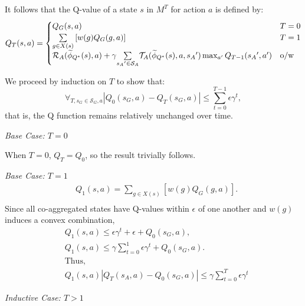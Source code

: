 It follows that the Q-value of a state $s$ in $M^T$ for action $a$ is defined by:
\begin{equation}
Q_T(s, a) = 
\begin{cases}
	   Q_G(s, a) &  T=0\\
	   \underset{g \in X(s)}{\sum} \left[ w(g)Q_G(g,a) \right] & T = 1\\
	   \mathcal{R}_A(\widetilde \phi_{Q^*}(s),a) + \gamma \underset{{s_A}' \in \mathcal{S}_A}{\sum} \mathcal{T}_A(\widetilde \phi_{Q^*}(s),a,{s_A}') \max_{a'} Q_{T-1}({s_A}', a') & \text{o/w}
\end{cases}
\end{equation}

We proceed by induction on $T$ to show that:
\begin{equation}
\forall_{T, s_G \in \mathcal{S}_G, a} |Q_0(s_G, a) - Q_T(s_G, a)| \leq \sum_{t=0}^{T-1} \epsilon \gamma^{t},
\end{equation}
that is, the Q function remains relatively unchanged over time.

\textit{Base Case: $T = 0$}

When $T = 0$, $Q_T = Q_0$, so the result trivially follows.

\textit{Base Case: $T = 1$}
\begin{align*}
&Q_1(s,a) = \underset{g \in X(s)}{\sum} \left[ w(g)Q_G(g,a) \right].\\
\end{align*}
Since all co-aggregated states have Q-values within $\epsilon$ of one another and $w(g)$ induces a convex combination,
\begin{align*}
&Q_1(s,a) \leq \epsilon \gamma^t + \epsilon + Q_0(s_G, a),\\
&Q_1(s,a) \leq \gamma\sum_{t=0}^{1} \epsilon \gamma^t + Q_0(s_G, a).\\
&\text{Thus,}\\
&Q_1(s,a) \left| Q_{T}(s_A, a) - Q_0(s_G,a) \right| \leq \gamma\sum_{t=0}^{T}\epsilon \gamma^t
\end{align*}



\textit{Inductive Case: $T > 1$}

